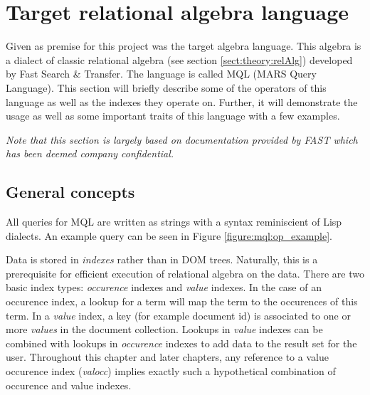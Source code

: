 \section{Target relational algebra language}
\label{sect:method:mql}
Given as premise for this project was the target algebra language. This
algebra is a dialect of classic relational algebra (see section
\ref{sect:theory:relAlg}) developed by Fast Search \& Transfer. The language
is called MQL (MARS Query Language). This section will briefly describe some of
the operators of this language as well as the indexes they operate on. Further, it will demonstrate
the usage as well as some important traits of this language with a few
examples.

\emph{Note that this section is largely based on documentation provided by FAST which
has been deemed company confidential. }

\subsection{General concepts}
\label{sect:method:mql:indexes}
\label{sect:method:mql:concepts}
All queries for MQL are written as strings with a syntax reminiscient of Lisp
dialects. An example query can be seen in Figure \ref{figure:mql:op_example}.

Data is stored in \textit{indexes} rather than in DOM trees. Naturally, this is a prerequisite for efficient
execution of relational algebra on the data. There are two basic index types: \textit{occurence} indexes and
\textit{value} indexes. In the case of an occurence index, a lookup for a term will map the term to the occurences
of this term. In a \textit{value} index, a key (for example document id) is associated to one or more
\textit{values} in the document collection. Lookups in \textit{value} indexes can be combined with lookups in
\textit{occurence} indexes to add data to the result set for the user.
Throughout this chapter and later chapters, any reference to a value occurence index (\textit{valocc})
implies exactly such a hypothetical combination of occurence and value indexes.

